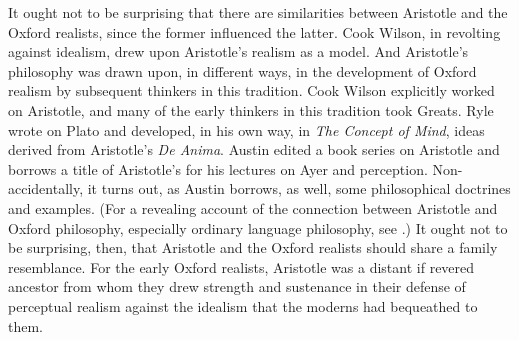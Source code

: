 It ought not to be surprising that there are similarities between Aristotle and the Oxford realists, since the former influenced the latter. Cook Wilson, in revolting against idealism, drew upon Aristotle's realism as a model. And Aristotle's philosophy was drawn upon, in different ways, in the development of Oxford realism by subsequent thinkers in this tradition. Cook Wilson explicitly worked on Aristotle, and many of the early thinkers in this tradition took Greats. Ryle wrote on Plato and developed, in his own way, in \emph{The Concept of Mind}, ideas derived from Aristotle's \emph{De Anima}. Austin edited a book series on Aristotle and borrows a title of Aristotle's for his lectures on Ayer and perception. Non-accidentally, it turns out, as Austin borrows, as well, some philosophical doctrines and examples. (For a revealing account of the connection between Aristotle and Oxford philosophy, especially ordinary language philosophy, see \citealt[Introduction]{Ackrill:1997tg}.) It ought not to be surprising, then, that Aristotle and the Oxford realists should share a family resemblance. For the early Oxford realists, Aristotle was a distant if revered ancestor from whom they drew strength and sustenance in their defense of perceptual realism against the idealism that the moderns had bequeathed to them.

